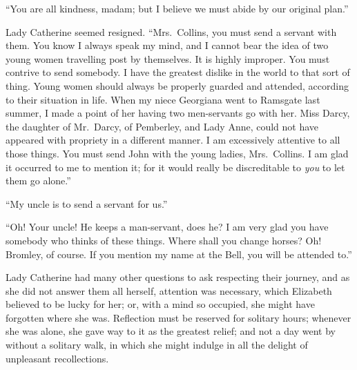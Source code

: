 ``You are all kindness, madam; but I believe we must abide by
our original plan.''

Lady Catherine seemed resigned.  ``Mrs.\ Collins, you must send
a servant with them.  You know I always speak my mind, and I
cannot bear the idea of two young women travelling post by
themselves.  It is highly improper.  You must contrive to send
somebody.  I have the greatest dislike in the world to that sort
of thing.  Young women should always be properly guarded and
attended, according to their situation in life.  When my niece
Georgiana went to Ramsgate last summer, I made a point of her
having two men-servants go with her.  Miss Darcy, the daughter
of Mr.\ Darcy, of Pemberley, and Lady Anne, could not have
appeared with propriety in a different manner.  I am excessively
attentive to all those things.  You must send John with the young
ladies, Mrs.\ Collins.  I am glad it occurred to me to mention it;
for it would really be discreditable to \emph{you} to let them go
alone.''

``My uncle is to send a servant for us.''

``Oh!  Your uncle!  He keeps a man-servant, does he?  I am very
glad you have somebody who thinks of these things.  Where
shall you change horses?  Oh!  Bromley, of course.  If you
mention my name at the Bell, you will be attended to.''

Lady Catherine had many other questions to ask respecting their
journey, and as she did not answer them all herself, attention was
necessary, which Elizabeth believed to be lucky for her; or, with
a mind so occupied, she might have forgotten where she was.
Reflection must be reserved for solitary hours; whenever she
was alone, she gave way to it as the greatest relief; and not a
day went by without a solitary walk, in which she might indulge
in all the delight of unpleasant recollections.

